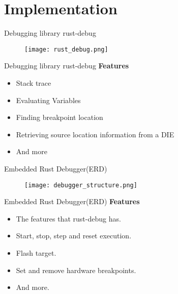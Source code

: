 \section{Implementation}

\begin{frame}{Debugging library rust-debug}
	\begin{figure}
		\texttt{[image: rust\_debug.png]}
	\end{figure}
\end{frame}


\begin{frame}{Debugging library rust-debug}
	\textbf{Features}
    \begin{itemize}
        \item Stack trace
        \item Evaluating Variables
        \item Finding breakpoint location
        \item Retrieving source location information from a DIE
        \item And more
    \end{itemize}
\end{frame}


\begin{frame}{Embedded Rust Debugger(ERD)}
	\begin{figure}
		\texttt{[image: debugger\_structure.png]}
	\end{figure}
\end{frame}


\begin{frame}{Embedded Rust Debugger(ERD)}
	\textbf{Features}
    \begin{itemize}
	\item The features that rust-debug has.
	\item Start, stop, step and reset execution.
	\item Flash target.
	\item Set and remove hardware breakpoints.
	\item And more.
    \end{itemize}
\end{frame}

